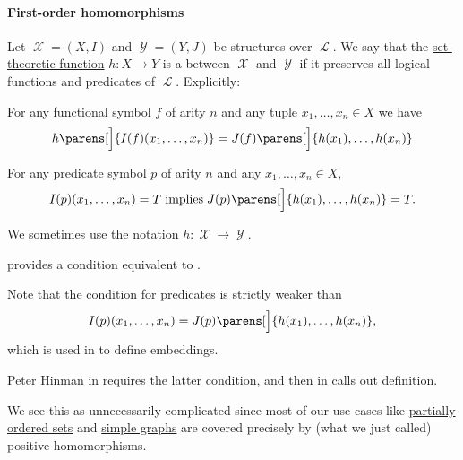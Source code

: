 \paragraph{First-order homomorphisms}

\begin{definition}\label{def:first_order_homomorphism}
  Let \( \mscrX = (X, I) \) and \( \mscrY = (Y, J) \) be structures over \( \mscrL \). We say that the \hyperref[def:function]{set-theoretic function} \( h: X \to Y \) is a  between \( \mscrX \) and \( \mscrY \) if it preserves all logical functions and predicates of \( \mscrL \). Explicitly:
  \begin{thmenum}
     For any functional symbol \( f \) of arity \( n \) and any tuple \( x_1, \ldots, x_n \in X \) we have
    \begin{equation}\label{eq:def:first_order_homomorphism/functions}
      h\parens[\Big]{ I(f)(x_1, \ldots, x_n) } = J(f) \parens[\Big]{ h(x_1), \ldots, h(x_n) }
    \end{equation}

     For any predicate symbol \( p \) of arity \( n \) and any \( x_1, \ldots, x_n \in X \),
    \begin{equation}\label{eq:def:first_order_homomorphism/predicates}
      I(p) (x_1, \ldots, x_n) = T \T{implies} J(p) \parens[\Big]{ h(x_1), \ldots, h(x_n) } = T.
    \end{equation}
  \end{thmenum}
\end{definition}
\begin{comments}
  \item We sometimes use the notation \( h: \mscrX \to \mscrY \).
  \item {} provides a condition equivalent to .
  \item Note that the condition  for predicates is strictly weaker than
  \begin{equation*}
    I(p) (x_1, \ldots, x_n) = J(p) \parens[\Big]{ h(x_1), \ldots, h(x_n) },
  \end{equation*}
  which is used in  to define embeddings.

  Peter Hinman in  requires the latter condition, and then in \cite[rem. 2.3.27]{Hinman2005} calls  out definition.

  We see this as unnecessarily complicated since most of our use cases like \hyperref[def:partially_ordered_set]{partially ordered sets} and \hyperref[def:directed_graph]{simple graphs} are covered precisely by (what we just called) positive homomorphisms.
\end{comments}

